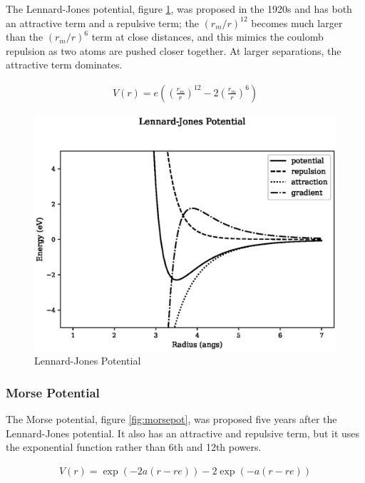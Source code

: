 The Lennard-Jones potential, figure \ref{fig:lennardjonespot}, was proposed in the 1920s and has both an attractive term and a repulsive term; the $(r_m/r)^{12}$ becomes much larger than the $(r_m/r)^6$ term at close distances, and this mimics the coulomb repulsion as two atoms are pushed closer together.  At larger separations, the attractive term dominates.

\begin{equation}
\begin{split}
V(r) = e \left(\left(\frac{r_m}{r}\right)^{12} - 2 \left(\frac{r_m}{r}\right)^6\right)
\end{split}
\label{eq:eqLennardJones}
\end{equation}

\begin{figure}[!htbp]
  \begin{center}
    \includegraphics[width=.6\linewidth]{chapters/interatomic_potential_fitting/plots_pair_potentials/lennard_jones.eps}
    \caption{Lennard-Jones Potential}
    \label{fig:lennardjonespot}
  \end{center}
\end{figure}



\FloatBarrier
\subsubsection{Morse Potential}
\label{section:Morse}

The Morse potential, figure \ref{fig:morsepot}, was proposed five years after the Lennard-Jones potential.  It also has an attractive and repulsive term, but it uses the exponential function rather than 6th and 12th powers.

\begin{equation}
\begin{split}
V(r) = \exp(-2 a (r - re)) - 2 \exp (-a(r - re))
\end{split}
\label{eq:eqLennardJones}
\end{equation}

